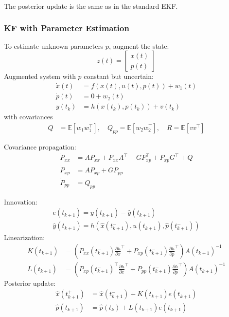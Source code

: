 \newpar{}

The posterior update is the same as in the standard EKF.

\subsubsection{KF with Parameter Estimation}

To estimate unknown parameters $p$, augment the state:
\begin{equation*}
    z(t) =
    \begin{bmatrix}
        x(t) \\
        p(t)
    \end{bmatrix}
\end{equation*}
Augmented system with $p$ constant but uncertain:
\begin{align*}
    \dot{x}(t) & = f(x(t), u(t), p(t)) + w_1(t) \\
    \dot{p}(t) & = 0 + w_2(t)                   \\
    y(t_k)     & = h(x(t_k), p(t_k)) + v(t_k)
\end{align*}
with covariances
\begin{align*}
    Q & = \mathbb{E}[w_1 w_1^\top], \quad Q_{pp} = \mathbb{E}[w_2 w_2^\top], \quad R = \mathbb{E}[v v^\top]
\end{align*}

\newpar{}

Covariance propagation:
\begin{align*}
    \dot{P}_{xx} & = A P_{xx} + P_{xx} A^\top + G P_{xp}^\top + P_{xp} G^\top + Q \\
    \dot{P}_{xp} & = A P_{xp} + G P_{pp}                                          \\
    \dot{P}_{pp} & = Q_{pp}
\end{align*}

\newpar{}
Innovation:
\begin{gather*}
    e(t_{k+1}) = y(t_{k+1}) - \hat{y}(t_{k+1})\\
    \hat{y}(t_{k+1}) = h(\hat{x}(t_{k+1}^-), u(t_{k+1}), \hat{p}(t_{k+1}^-))
\end{gather*}
\newpar{}
Linearization:
\begin{align*}
    K(t_{k+1}) & = \left( P_{xx}(t_{k+1}^-) \frac{\partial h}{\partial x}^\top + P_{xp}(t_{k+1}^-) \frac{\partial h}{\partial p}^\top \right) A(t_{k+1})^{-1}      \\
    L(t_{k+1}) & = \left( P_{xp}(t_{k+1}^-)^\top \frac{\partial h}{\partial x}^\top + P_{pp}(t_{k+1}^-) \frac{\partial h}{\partial p}^\top \right) A(t_{k+1})^{-1}
\end{align*}
Posterior update:
\begin{align*}
    \hat{x}(t_{k+1}^+) & = \hat{x}(t_{k+1}^-) + K(t_{k+1}) e(t_{k+1}) \\
    \hat{p}(t_{k+1})   & = \hat{p}(t_k) + L(t_{k+1}) e(t_{k+1})
\end{align*}


